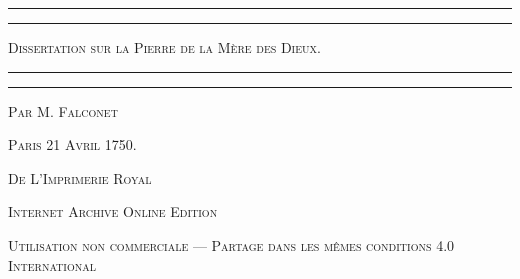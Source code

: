 \documentclass[a4paper, 11pt, oneside, polutonikogreek, french]{article}
\begin{document}
\begin{titlepage} %
	\centering %

	
	\rule{\textwidth}{1.6pt}\vspace*{-\baselineskip}\vspace*{2pt} %
	\rule{\textwidth}{0.4pt} %
	
	\vspace{1\baselineskip} %
	
	{\scshape\Huge Dissertation sur la Pierre de la Mère des Dieux.}
	
	\vspace{1\baselineskip} %

	\rule{\textwidth}{0.4pt}\vspace*{-\baselineskip}\vspace{3.2pt} %
	\rule{\textwidth}{1.6pt} %
	
	\vspace{1\baselineskip} %
	
	
	{\scshape \Large Par M. Falconet} %
	
	\vspace*{1\baselineskip} %
	
        {\scshape\scriptsize } %
    
        \vspace*{\fill}

	\vspace{1\baselineskip}

	{\small\scshape Paris 21 Avril 1750.}
	
	{\small\scshape{De L'Imprimerie Royal}}
	
	\vspace{0.5\baselineskip} %

        \scshape Internet Archive Online Edition  %
	
	{\scshape\small Utilisation non commerciale --- Partage dans les mêmes conditions 4.0 International} %
\end{titlepage}
\setlength{\parskip}{1mm plus1mm minus1mm}
\clearpage
\large
\end{document}
